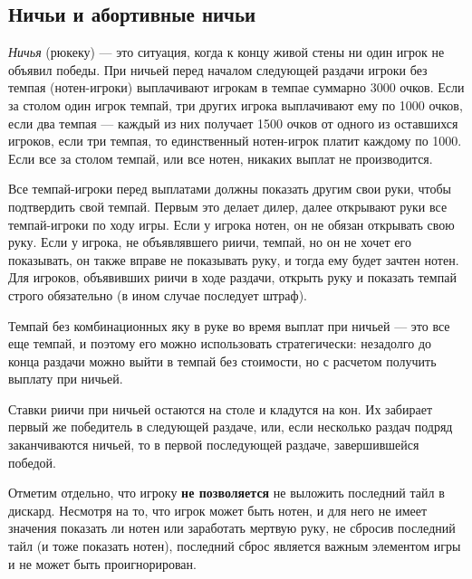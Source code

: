 \subsection{Ничьи и абортивные ничьи}

\textit{Ничья} (рюкеку) --- это ситуация, когда к концу живой стены ни один игрок не объявил победы. При ничьей перед началом следующей раздачи игроки без темпая (нотен-игроки) выплачивают игрокам в темпае суммарно 3000 очков. Если за столом один игрок темпай, три других игрока выплачивают ему по 1000 очков, если два темпая --- каждый из них получает 1500 очков от одного из оставшихся игроков, если три темпая, то единственный нотен-игрок платит каждому по 1000. Если все за столом темпай, или все нотен, никаких выплат не производится.

Все темпай-игроки перед выплатами должны показать другим свои руки, чтобы подтвердить свой темпай. Первым это делает дилер, далее открывают руки все темпай-игроки по ходу игры. Если у игрока нотен, он не обязан открывать свою руку. Если у игрока, не объявлявшего риичи, темпай, но он не хочет его показывать, он также вправе не показывать руку, и тогда ему будет зачтен нотен. Для игроков, объявивших риичи в ходе раздачи, открыть руку и показать темпай строго обязательно (в ином случае последует штраф).

Темпай без комбинационных яку в руке во время выплат при ничьей --- это все еще темпай, и поэтому его можно использовать стратегически: незадолго до конца раздачи можно выйти в темпай без стоимости, но с расчетом получить выплату при ничьей. 

Ставки риичи при ничьей остаются на столе и кладутся на кон. Их забирает первый же победитель в следующей раздаче, или, если несколько раздач подряд заканчиваются ничьей, то в первой последующей раздаче, завершившейся победой. 

Отметим отдельно, что игроку \textbf{не позволяется} не выложить последний тайл в дискард. Несмотря на то, что игрок может быть нотен, и для него не имеет значения показать ли нотен или заработать мертвую руку, не сбросив последний тайл (и тоже показать нотен), последний сброс является важным элементом игры и не может быть проигнорирован.

